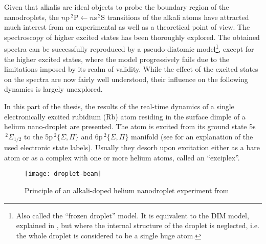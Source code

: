 	Given that alkalis are ideal objects to probe the boundary region of the nanodroplets, the $n\mathrm{p}\,^2\mathrm{P}\!\longleftarrow\!n\mathrm{s}\,^2\mathrm{S}$ transitions of the alkali atoms have attracted much interest from an experimental as well as a theoretical point of view. The spectroscopy of higher excited states has been thoroughly explored\citep{Log11b,Log11a,Lackner2012,Lackner2013,The11,Fec12,Pif10,Lac11,Theisen2011,Lac13}. The obtained spectra can be successfully reproduced by a pseudo-diatomic model\footnote{Also called the ``frozen droplet'' model. It is equivalent to the DIM model, explained in , but where the internal structure of the droplet is neglected, i.e. the whole droplet is considered to be a single huge atom.}, except for the higher excited states, where the model progressively fails due to the limitations imposed by its realm of validity\citep{Sti96,Bunermann2007}. While the effect of the excited states on the spectra are now fairly well understood, their influence on the following dynamics is largely unexplored.
	
	In this part of the thesis, the results of the real-time dynamics of a single electronically excited rubidium (Rb) atom residing in the surface dimple of a helium nano-droplet are presented. The atom is excited from its ground state 5s$\,^2\Sigma_{1/2}$ to the 5p$\,^2\{\Sigma,\Pi\}$ and 6p$\,^2\{\Sigma,\Pi\}$ manifold (see  for an explanation of the used electronic state labels). Usually they desorb upon excitation either as a bare atom or as a complex with one or more helium atoms, called an ``exciplex''.	
	\begin{figure}[t]
		\begin{center}
			\texttt{[image: droplet-beam]}
			\caption{Principle of an alkali-doped helium nanodroplet experiment from}
			\label{fig:droplet-beam}
		\end{center}
	\end{figure}
	
